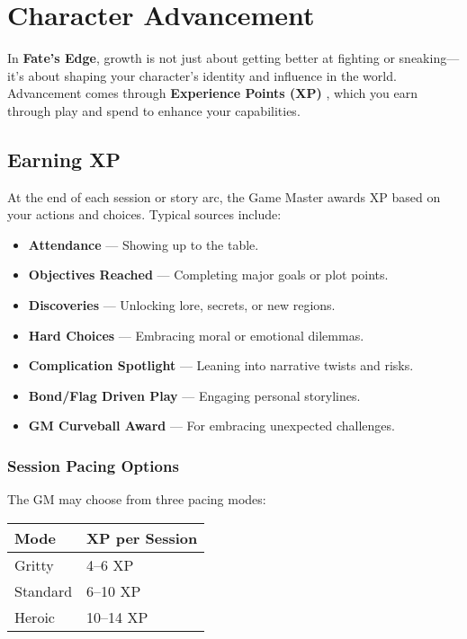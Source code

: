 
\chapter{Character Advancement}
\label{ch:advancement}

In \textbf{Fate's Edge}, growth is not just about getting better at fighting or sneaking—it's about shaping your character's identity and influence in the world. Advancement comes through \textbf{Experience Points (XP)} , which you earn through play and spend to enhance your capabilities.

\section{Earning XP}

At the end of each session or story arc, the Game Master awards XP based on your actions and choices. Typical sources include:

\begin{itemize}
  \item \textbf{Attendance} — Showing up to the table.
  \item \textbf{Objectives Reached} — Completing major goals or plot points.
  \item \textbf{Discoveries} — Unlocking lore, secrets, or new regions.
  \item \textbf{Hard Choices} — Embracing moral or emotional dilemmas.
  \item \textbf{Complication Spotlight} — Leaning into narrative twists and risks.
  \item \textbf{Bond/Flag Driven Play} — Engaging personal storylines.
  \item \textbf{GM Curveball Award} — For embracing unexpected challenges.
\end{itemize}

\subsection*{Session Pacing Options}

The GM may choose from three pacing modes:

\begin{center}
\begin{tabular}{ll}
\toprule
\textbf{Mode} & \textbf{XP per Session} \\
\midrule
Gritty & 4–6 XP \\
Standard & 6–10 XP \\
Heroic & 10–14 XP \\
\bottomrule
\end{tabular}
\end{center}

